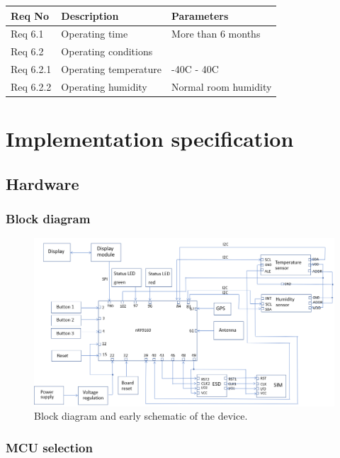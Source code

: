 \documentclass[]{dithesis}
\begin{document}
\begin{tabular}{| l | m{6.5cm} | m{6.5cm} |}
\hline
\textbf{Req No} & \textbf{Description} & \textbf{Parameters}  \\
\hline
Req 6.1 & Operating time & More than 6 months  \\
\hline
Req 6.2 & Operating conditions & \\
\hline
Req 6.2.1 & Operating temperature & -40C - 40C \\
\hline
Req 6.2.2 & Operating humidity & Normal room humidity \\
\hline
\end{tabular}

\chapter{Implementation specification}

\section{Hardware}

\subsection{Block diagram}

\begin{figure}[hbt!]
    \centering
    \includegraphics[width=16cm]{blockdiagramsulari.png}
    \caption{Block diagram and early schematic of the device.}
    \label{fig:my_label}
\end{figure}

\subsection{MCU selection}
\end{document}
